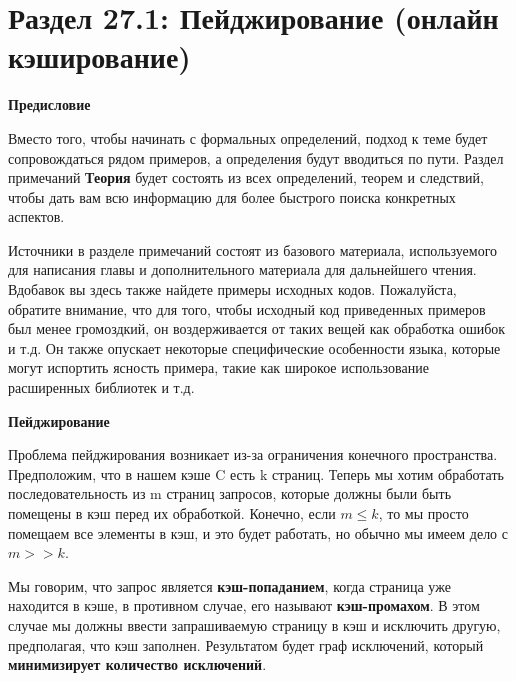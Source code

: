 \section*{Раздел 27.1: Пейджирование (онлайн кэширование)}

\textbf{Предисловие}

\vspace{\baselineskip}

Вместо того, чтобы начинать с формальных определений, подход к теме будет сопровождаться рядом примеров, а определения будут вводиться по пути. Раздел примечаний \textbf{Теория} будет состоять из всех определений, теорем и следствий, чтобы дать вам всю информацию для более быстрого поиска конкретных аспектов.

\vspace{\baselineskip}

Источники в разделе примечаний состоят из базового материала, используемого для написания главы и дополнительного материала для дальнейшего чтения. Вдобавок вы здесь также найдете примеры исходных кодов. Пожалуйста, обратите внимание, что для того, чтобы исходный код приведенных примеров был менее громоздкий, он воздерживается от таких вещей как обработка ошибок и т.д. Он также опускает некоторые специфические особенности языка, которые могут испортить ясность примера, такие как широкое использование расширенных библиотек и т.д.

\vspace{\baselineskip}

\textbf{Пейджирование}

\vspace{\baselineskip}

Проблема пейджирования возникает из-за ограничения конечного
пространства. Предположим, что в нашем кэше C есть k страниц. Теперь мы хотим обработать последовательность из m страниц запросов, которые должны были быть помещены в кэш перед их обработкой. Конечно, если $m \leq k$, то мы просто помещаем все элементы в кэш, и это будет работать, но обычно мы имеем дело с $m>>k$.

\vspace{\baselineskip}

Мы говорим, что запрос является \textbf{кэш-попаданием}, когда страница уже находится в кэше, в противном случае, его называют \textbf{кэш-промахом}. В этом случае мы должны ввести запрашиваемую страницу в кэш и исключить другую, предполагая, что кэш заполнен. Результатом будет граф исключений, который \textbf{минимизирует количество исключений}.

